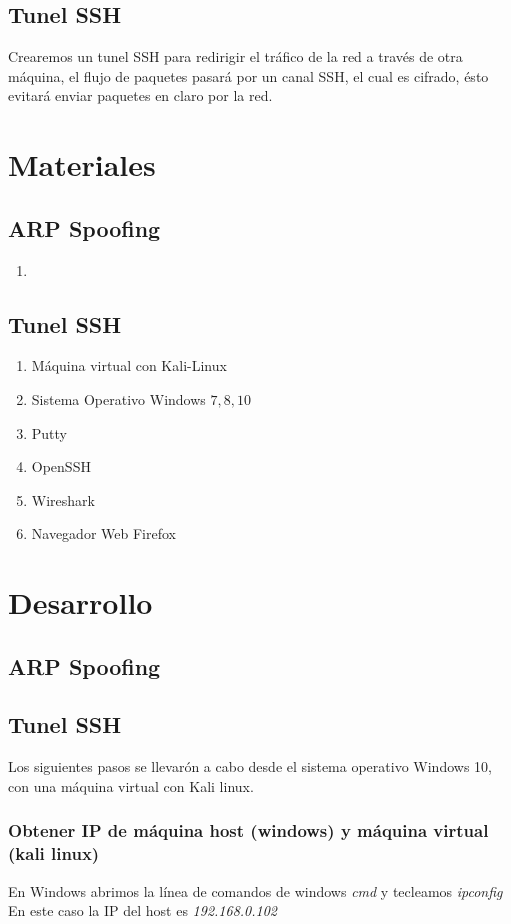 \documentclass{article}
\begin{document}
\subsection{Tunel SSH}
Crearemos un tunel SSH para redirigir el tr\'afico de la red a trav\'es de otra m\'aquina, el flujo de paquetes pasar\'a por un canal SSH, el cual es cifrado, \'esto evitar\'a enviar paquetes en claro por la red.

\section{Materiales}

\subsection{ARP Spoofing}
\begin{enumerate}
	\item 
\end{enumerate}

\subsection{Tunel SSH}
\begin{enumerate}
\item M\'aquina virtual con Kali-Linux
\item Sistema Operativo Windows \(7,8,10\)
\item Putty
\item OpenSSH
\item Wireshark
\item Navegador Web Firefox
\end{enumerate}

\section{Desarrollo}
\subsection{ARP Spoofing}

\subsection{Tunel SSH}
Los siguientes pasos se llevarón a cabo desde el sistema operativo Windows 10, con una m\'aquina virtual con Kali linux.

\subsubsection{Obtener IP de m\'aquina host (windows) y m\'aquina virtual (kali linux)}
En Windows abrimos la l\'inea de comandos de windows \emph{cmd} y tecleamos \emph{ipconfig}
En este caso la IP del host es \emph{192.168.0.102}
\end{document}
